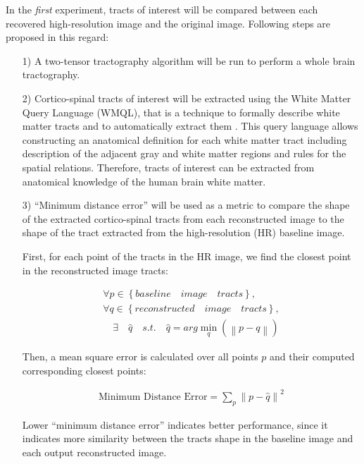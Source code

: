 In the \textit{first} experiment, tracts of interest will be compared between each recovered high-resolution image and the original image. Following steps are proposed in this regard:
\begin{itemize}
\item[1)] A two-tensor tractography algorithm \cite{Malcolm2010, baumgartner2012} will be run to perform a whole brain tractography.

\item[2)] Cortico-spinal tracts of interest will be extracted using the White Matter Query Language (WMQL), that is a technique to formally describe white matter tracts and to automatically extract them \cite{wassermann2013}.
This query language allows constructing an anatomical definition for each white matter tract including description of the adjacent gray and white matter regions and rules for the spatial relations. Therefore, tracts of interest can be extracted from anatomical knowledge of the human brain white matter.

\item[3)] ``Minimum distance error'' will be used as a metric to compare the shape of the extracted cortico-spinal tracts from each reconstructed image to the shape of the tract extracted from the high-resolution (HR) baseline image.

First, for each point of the tracts in the HR image, we find the closest point in the reconstructed image tracts:

\begin{equation}
\begin{gathered}
\forall p\in \left\{baseline \quad image \quad tracts \right\}, \\
\forall q\in \left\{reconstructed \quad image \quad tracts \right\}, \\
\quad \exists \quad \hat{q} \quad s.t. \quad
\hat{q} = arg\min_q(\left \| p - q \right \|)
\end{gathered}
\end{equation}

Then, a mean square error is calculated over all points $p$ and their computed corresponding closest points:

\begin{equation}
\label{eq:minDist}
\begin{gathered}
\text{Minimum Distance Error} = \sum_{p} \left \| p - \hat{q} \right \|^2
\end{gathered}
\end{equation}

Lower ``minimum distance error'' indicates better performance, since it indicates more similarity between the tracts shape in the baseline image and each output reconstructed image.

\end{itemize}


